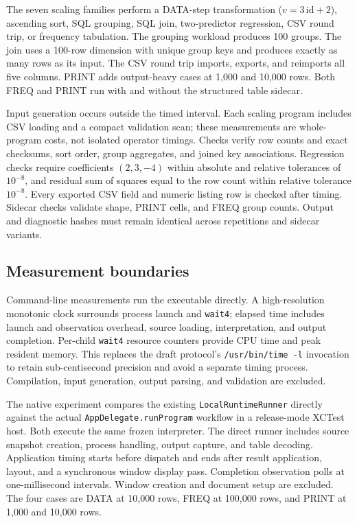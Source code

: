 \documentclass[11pt,a4paper]{article}
\begin{document}
The seven scaling families perform a DATA-step transformation
($v=3\,\mathrm{id}+2$), ascending sort, SQL grouping, SQL join,
two-predictor regression, CSV round trip, or frequency tabulation.
The grouping workload produces 100 groups. The join uses a
100-row dimension with unique group keys and produces exactly
as many rows as its input. The CSV round trip imports, exports,
and reimports all five columns. PRINT adds output-heavy cases
at 1,000 and 10,000 rows. Both FREQ and PRINT run with and
without the structured table sidecar.

Input generation occurs outside the timed interval. Each scaling
program includes CSV loading and a compact validation scan;
these measurements are whole-program costs, not isolated
operator timings. Checks verify row counts and exact checksums,
sort order, group aggregates, and joined key associations.
Regression checks require coefficients $(2,3,-4)$ within absolute
and relative tolerances of $10^{-8}$, and residual sum of squares
equal to the row count within relative tolerance $10^{-8}$.
Every exported CSV field and numeric listing row is checked
after timing. Sidecar checks validate shape, PRINT cells, and
FREQ group counts. Output and diagnostic hashes must remain identical
across repetitions and sidecar variants.

\subsection{Measurement boundaries}

Command-line measurements run the executable directly. A
high-resolution monotonic clock surrounds process launch and
\texttt{wait4}; elapsed time includes launch and observation
overhead, source loading, interpretation, and output completion.
Per-child \texttt{wait4} resource counters provide CPU time and
peak resident memory. This replaces the draft protocol's
\texttt{/usr/bin/time -l} invocation to retain sub-centisecond
precision and avoid a separate timing process. Compilation,
input generation, output parsing, and validation are excluded.

The native experiment compares the existing
\texttt{LocalRuntimeRunner} directly against the actual
\texttt{AppDelegate.runProgram} workflow in a release-mode XCTest
host. Both execute the same frozen interpreter. The direct
runner includes source snapshot creation, process handling,
output capture, and table decoding. Application timing starts
before dispatch and ends after result application, layout, and
a synchronous window display pass. Completion observation polls
at one-millisecond intervals. Window creation and document setup
are excluded. The four cases are DATA at 10,000 rows, FREQ at
100,000 rows, and PRINT at 1,000 and 10,000 rows.
\end{document}
